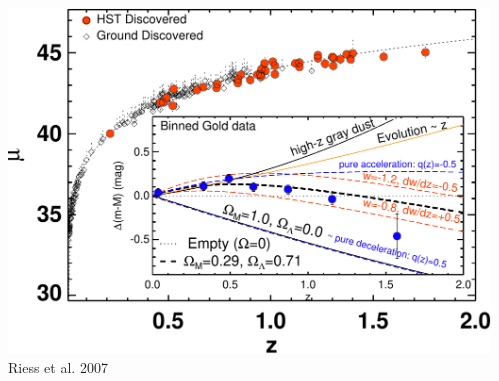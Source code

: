\documentclass{beamer}
\begin{document}
{\begin{columns}
\begin{column}{0.5\textwidth}
\begin{itemize}
            \end{itemize}
        \end{column}
        \begin{column}{0.5\textwidth}
            \begin{center}
                \includegraphics[width=\textwidth]{riess-distmodulus.pdf}
                \newline
                Riess et al. 2007
            \end{center}
        \end{column}
    \end{columns}
}
\end{document}
